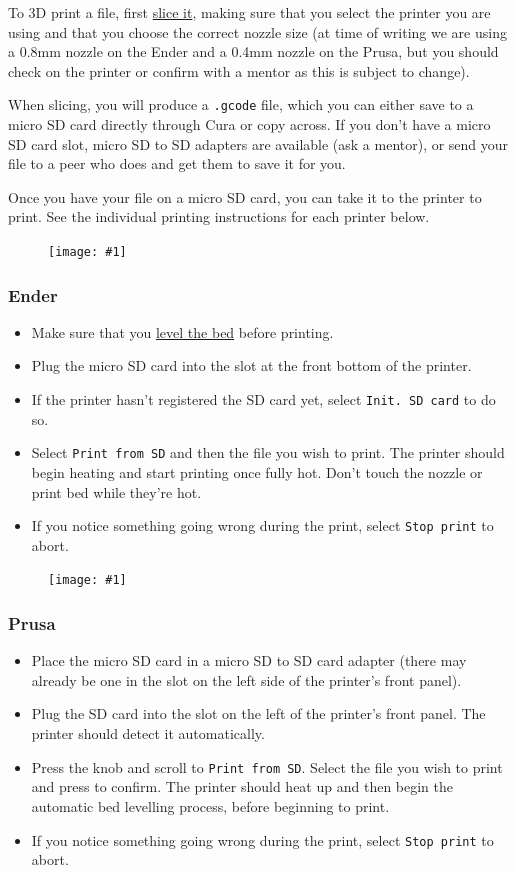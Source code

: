 \documentclass[12pt]{report}
\newcommand{\imageright}[3]{
    \begin{figure}
        \centering
        \texttt{[image: \#1]}
        \vspace*{#3}
    \end{figure}
}
\begin{document}
To 3D print a file, first \hyperref[sec:slicing]{slice it}, making sure that you
select the printer you are using and that you choose the correct nozzle size (at
time of writing we are using a 0.8mm nozzle on the Ender and a 0.4mm nozzle on
the Prusa, but you should check on the printer or confirm with a mentor as this
is subject to change). \par
When slicing, you will produce a \texttt{.gcode} file, which you can either save
to a micro SD card directly through Cura or copy across. If you don't have a
micro SD card slot, micro SD to SD adapters are available (ask a mentor), or
send your file to a peer who does and get them to save it for you. \par
Once you have your file on a micro SD card, you can take it to the printer to
print. See the individual printing instructions for each printer below. 

\imageright{ender.jpg}{.25}{-2cm}
\subsubsection*{Ender}

\begin{itemize}
    \item Make sure that you \hyperref[sec:levelling]{level the bed} before
        printing.
    \item Plug the micro SD card into the slot at the front bottom of the
        printer.
    \item If the printer hasn't registered the SD card yet, select
        \texttt{Init. SD card} to do so.
    \item Select \texttt{Print from SD} and then the file you wish to
        print. The printer should begin heating and start printing once fully
        hot. Don't touch the nozzle or print bed while they're hot.
    \item If you notice something going wrong during the print, select
        \texttt{Stop print} to abort.
\end{itemize}

\imageright{prusa.jpg}{.25}{-2cm}
\subsubsection*{Prusa}

\begin{itemize}
    \item Place the micro SD card in a micro SD to SD card adapter (there may
        already be one in the slot on the left side of the printer's front
        panel).
    \item Plug the SD card into the slot on the left of the printer's front
        panel. The printer should detect it automatically.
    \item Press the knob and scroll to \texttt{Print from SD}. Select the file
        you wish to print and press to confirm. The printer should heat up and
        then begin the automatic bed levelling process, before beginning to
        print.
    \item If you notice something going wrong during the print, select
        \texttt{Stop print} to abort.
\end{itemize}
\end{document}
